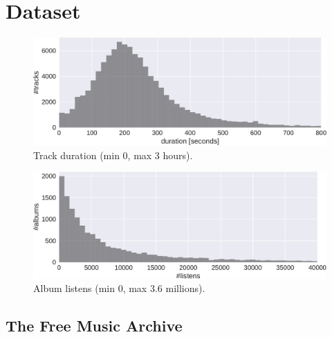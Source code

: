\documentclass{article}
\begin{document}
\section{Dataset} %


\begin{figure}
	\centering
	\includegraphics[width=\linewidth]{duration_distribution.pdf}
	\caption{Track duration (min 0, max 3 hours).}
	\label{fig:duration_distribution}
\end{figure}

\begin{figure}
	\centering
	\includegraphics[width=\linewidth]{listens_distribution.pdf}
	\caption{Album listens (min 0, max 3.6 millions).}
	\label{fig:listens_distribution}
\end{figure}

\subsection{The Free Music Archive}
\end{document}
